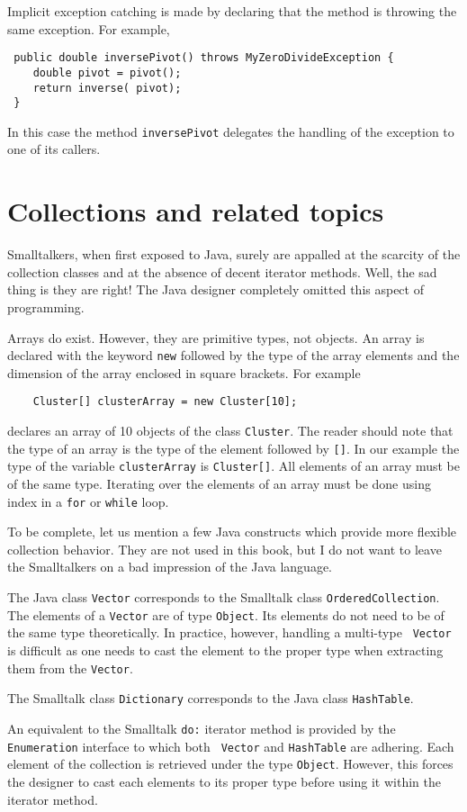 \documentclass[twoside]{book}
\begin{document}
Implicit exception catching is made by declaring that the method
is throwing the same exception. For example,
\begin{verbatim}
 public double inversePivot() throws MyZeroDivideException {
    double pivot = pivot();
    return inverse( pivot);
 }
\end{verbatim}
In this case the method {\tt inversePivot} delegates the handling
of the exception to one of its callers.

\section{Collections and related topics}
Smalltalkers, when first exposed to Java, surely are appalled at
the scarcity of the collection classes and at the absence of
decent iterator methods. Well, the sad thing is they are right!
The Java designer completely omitted this aspect of programming.

Arrays do exist. However, they are primitive types, not objects.
An array is declared with the keyword {\tt new} followed by the
type of the array elements and the dimension of the array enclosed
in square brackets. For example
\begin{verbatim}
    Cluster[] clusterArray = new Cluster[10];
\end{verbatim}
declares an array of 10 objects of the class {\tt Cluster}. The
reader should note that the type of an array is the type of the
element followed by {\tt []}. In our example the type of the
variable {\tt clusterArray} is {\tt Cluster[]}. All elements of an
array must be of the same type. Iterating over the elements of an
array must be done using index in a {\tt for} or {\tt while} loop.

To be complete, let us mention a few Java constructs which provide
more flexible collection behavior. They are not used in this book,
but I do not want to leave the Smalltalkers on a bad impression of
the Java language.

The Java class {\tt Vector} corresponds to the Smalltalk class
{\tt OrderedCollection}. The elements of a {\tt Vector} are of
type {\tt Object}. Its elements do not need to be of the same type
theoretically. In practice, however, handling a multi-type {\tt
Vector} is difficult as one needs to cast the element to the
proper type when extracting them from the {\tt Vector}.

\noindent The Smalltalk class {\tt Dictionary} corresponds to the
Java class {\tt HashTable}.

An equivalent to the Smalltalk {\tt do:} iterator method is
provided by the {\tt Enumeration} interface to which both {\tt
Vector} and {\tt HashTable} are adhering. Each element of the
collection is retrieved under the type {\tt Object}. However, this
forces the designer to cast each elements to its proper type
before using it within the iterator method.

\ifx\wholebook\relax\else
\end{document}
